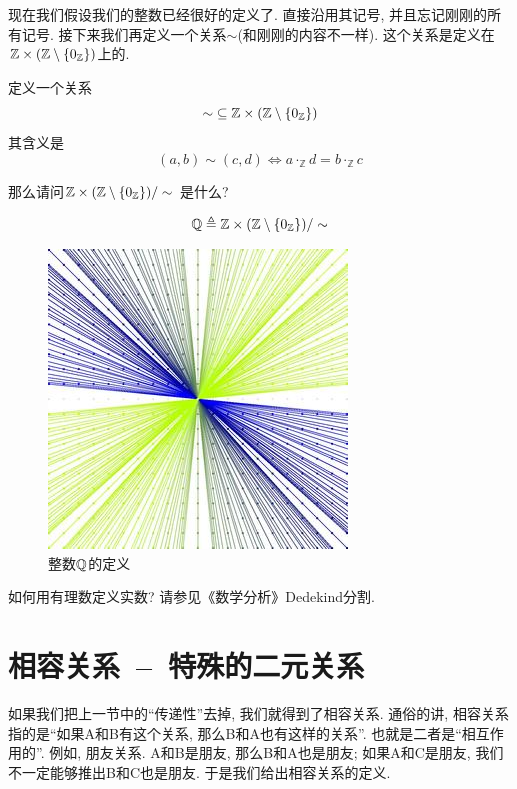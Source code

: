现在我们假设我们的整数已经很好的定义了. 直接沿用其记号, 并且忘记刚刚的所有记号. 接下来我们再定义一个关系$\sim$(和刚刚的内容不一样). 这个关系是定义在$\mathbb{Z}\times (\mathbb{Z} \setminus \{0_{\mathbb{Z}}\})$上的. 

\begin{definition}
定义一个关系
  \[
    \sim\; \subseteq \mathbb{Z} \times (\mathbb{Z} \setminus \{0_{\mathbb{Z}}\})
  \]
其含义是
  \[
    (a, b) \sim (c, d) \iff a \cdot_{\mathbb{Z}} d = b \cdot_{\mathbb{Z}} c
  \]
\end{definition}

那么请问$\mathbb{Z} \times (\mathbb{Z} \setminus \{0_{\mathbb{Z}}\})/\sim$ 是什么? 


\begin{definition}[$\mathbb{Q}$]
  \[
    \mathbb{Q} \triangleq \mathbb{Z} \times (\mathbb{Z} \setminus \{0_{\mathbb{Z}}\})/\sim
  \]
\end{definition}

\begin{figure}
	\centering
	\includegraphics[scale=0.5]{3-set-theory/figs/qdef}
	
	\caption{整数$\mathbb{Q}$的定义}
	\label{fig:qdef}
\end{figure}

如何用有理数定义实数? 请参见《数学分析》Dedekind分割. 

\section{相容关系~--~特殊的二元关系}

如果我们把上一节中的``传递性''去掉, 我们就得到了相容关系. 通俗的讲, 相容关系指的是``如果A和B有这个关系, 那么B和A也有这样的关系''. 也就是二者是``相互作用的''. 例如, 朋友关系. A和B是朋友, 那么B和A也是朋友; 如果A和C是朋友, 我们不一定能够推出B和C也是朋友. 于是我们给出相容关系的定义. 

